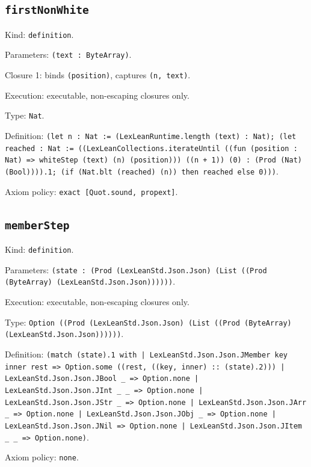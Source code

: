 \documentclass[11pt]{article}
\begin{document}
\subsection*{\texttt{firstNonWhite}}
\noindent Kind: \texttt{definition}.\par
\noindent Parameters: \texttt{(text : ByteArray)}.\par
\noindent Closure 1: binds \texttt{(position)}, captures \texttt{(n, text)}.\par
\noindent Execution: executable, non-escaping closures only.\par
\noindent Type: \texttt{Nat}.\par
\noindent Definition: \texttt{(let n : Nat := (LexLeanRuntime.length (text) : Nat); (let reached : Nat := ((LexLeanCollections.iterateUntil ((fun (position : Nat) => whiteStep (text) (n) (position))) ((n + 1)) (0) : (Prod (Nat) (Bool)))).1; (if (Nat.blt (reached) (n)) then reached else 0)))}.\par
\noindent Axiom policy: \texttt{exact [Quot.sound, propext]}.\par
\subsection*{\texttt{memberStep}}
\noindent Kind: \texttt{definition}.\par
\noindent Parameters: \texttt{(state : (Prod (LexLeanStd.Json.Json) (List ((Prod (ByteArray) (LexLeanStd.Json.Json))))))}.\par
\noindent Execution: executable, non-escaping closures only.\par
\noindent Type: \texttt{Option ((Prod (LexLeanStd.Json.Json) (List ((Prod (ByteArray) (LexLeanStd.Json.Json))))))}.\par
\noindent Definition: \texttt{(match (state).1 with | LexLeanStd.Json.Json.JMember key inner rest => Option.some ((rest, ((key, inner) :: (state).2))) | LexLeanStd.Json.Json.JBool \_ => Option.none | LexLeanStd.Json.Json.JInt \_ \_ => Option.none | LexLeanStd.Json.Json.JStr \_ => Option.none | LexLeanStd.Json.Json.JArr \_ => Option.none | LexLeanStd.Json.Json.JObj \_ => Option.none | LexLeanStd.Json.Json.JNil => Option.none | LexLeanStd.Json.Json.JItem \_ \_ => Option.none)}.\par
\noindent Axiom policy: \texttt{none}.\par
\end{document}
